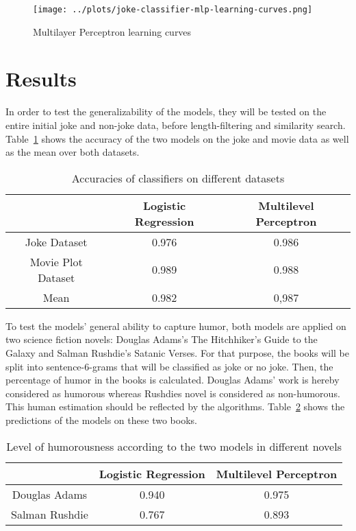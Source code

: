\documentclass[12pt]{scrartcl}
\begin{document}
\begin{figure}
    \texttt{[image: ../plots/joke-classifier-mlp-learning-curves.png]}
    \caption{Multilayer Perceptron learning curves}
    \label{fig:mlp-learning-curve}
\end{figure}

\section{Results}

In order to test the generalizability of the models, they will be tested on the entire initial joke and non-joke data, before length-filtering and similarity search.
Table~\ref{table:1} shows the accuracy of the two models on the joke and movie data as well as the mean over both datasets. 

\begin{table}
    \centering
        \begin{tabular}{|c| c c|} 
            \hline
              & Logistic Regression & Multilevel Perceptron \\ [0.5ex] 
            \hline
            Joke Dataset & 0.976 & 0.986  \\
            Movie Plot Dataset & 0.989 & 0.988 \\
            \hline
            Mean & 0.982 & 0,987 \\
            \hline
        \end{tabular}
        \caption{Accuracies of classifiers on different datasets}
        \label{table:1}
\end{table}

To test the models' general ability to capture humor, both models are applied on two science fiction novels: Douglas Adams's The Hitchhiker's Guide to the Galaxy and Salman Rushdie's Satanic Verses.
For that purpose, the books will be split into sentence-6-grams that will be classified as joke or no joke.
Then, the percentage of humor in the books is calculated.
Douglas Adams' work is hereby considered as humorous whereas Rushdies novel is considered as non-humorous.
This human estimation should be reflected by the algorithms.
Table~\ref{table:2} shows the predictions of the models on these two books.

\begin{table}
    \centering
        \begin{tabular}{|c| c c|} 
            \hline
              & Logistic Regression & Multilevel Perceptron \\ [0.5ex] 
            \hline
            Douglas Adams & 0.940 & 0.975  \\
            Salman Rushdie & 0.767 & 0.893 \\
            \hline
        \end{tabular}
        \caption{Level of humorousness according to the two models in different novels}
        \label{table:2}
\end{table}
\end{document}
